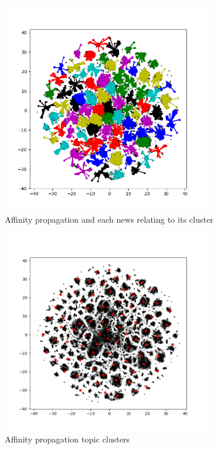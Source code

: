 \documentclass[ecp,tc,english]{iiufrgs}
\begin{document}
            \begin{figure}
                \centering
                \includegraphics[width=0.8\textwidth]{images/affinity_plot.png}
                \caption{Affinity propagation and each news relating to its cluster}
                \label{fig:affinity_propagation_clusters}
            \end{figure}
            
            \begin{figure}
                \centering
                \includegraphics[width=0.8\textwidth]{images/tsne_clusters_plot.png}
                \caption{Affinity propagation topic clusters}
                \label{fig:affinity_propagation_centers}
            \end{figure}    
    
\end{document}
